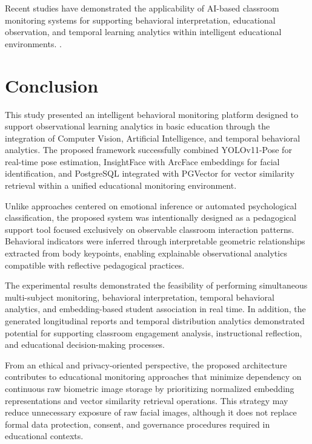 \documentclass[12pt,a4paper]{article}
\begin{document}
Recent studies have demonstrated the applicability of AI-based classroom monitoring systems for supporting behavioral interpretation, educational observation, and temporal learning analytics within intelligent educational environments. \cite{chenStudentBehaviorDetection2023,huRealTimeClassroomBehavior2024,liRealTimeClassroomBehavior2025,mitomaBehaviorMonitoringSystem2025,yangStudentClassroomBehavior2024}.

\section{Conclusion}

This study presented an intelligent behavioral monitoring platform designed to support observational learning analytics in basic education through the integration of Computer Vision, Artificial Intelligence, and temporal behavioral analytics. The proposed framework successfully combined YOLOv11-Pose for real-time pose estimation, InsightFace with ArcFace embeddings for facial identification, and PostgreSQL integrated with PGVector for vector similarity retrieval within a unified educational monitoring environment.

Unlike approaches centered on emotional inference or automated psychological classification, the proposed system was intentionally designed as a pedagogical support tool focused exclusively on observable classroom interaction patterns. Behavioral indicators were inferred through interpretable geometric relationships extracted from body keypoints, enabling explainable observational analytics compatible with reflective pedagogical practices.

The experimental results demonstrated the feasibility of performing simultaneous multi-subject monitoring, behavioral interpretation, temporal behavioral analytics, and embedding-based student association in real time. In addition, the generated longitudinal reports and temporal distribution analytics demonstrated potential for supporting classroom engagement analysis, instructional reflection, and educational decision-making processes.

From an ethical and privacy-oriented perspective, the proposed architecture contributes to educational monitoring approaches that minimize dependency on continuous raw biometric image storage by prioritizing normalized embedding representations and vector similarity retrieval operations. This strategy may reduce unnecessary exposure of raw facial images, although it does not replace formal data protection, consent, and governance procedures required in educational contexts.
\end{document}
